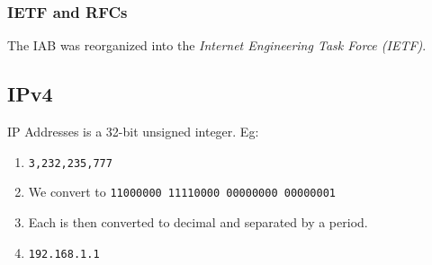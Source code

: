 \documentclass{article}
\begin{document}
\subsubsection{IETF and RFCs}
The IAB was reorganized into the \emph{Internet Engineering Task Force (IETF)}.

\subsection{IPv4}
IP Addresses is a 32-bit unsigned integer.
Eg:
\begin{enumerate}
    \setlength{\itemsep}{0em}
    \item \texttt{3,232,235,777}
    \item We convert to \texttt{11000000 11110000 00000000 00000001}
    \item Each is then converted to decimal and separated by a period.
    \item \texttt{192.168.1.1}
\end{enumerate}

\large
\end{document}
